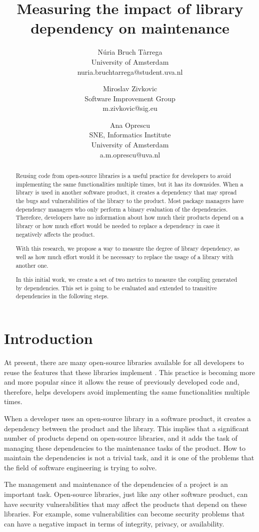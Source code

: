 \documentclass[a4paper]{article}
\title{Measuring the impact of library dependency on maintenance}
\author{
Núria Bruch Tàrrega \\ University of Amsterdam \\ nuria.bruchtarrega@student.uva.nl
\and
Miroslav Zivkovic \\ Software Improvement Group \\ m.zivkovic@sig.eu
\and
Ana Oprescu \\ SNE, Informatics Institute\\
                University of Amsterdam \\ a.m.oprescu@uva.nl
}
\begin{document}
\maketitle

\begin{abstract}
Reusing code from open-source libraries is a useful practice for developers to avoid implementing the same functionalities multiple times, but it has its downsides. When a library is used in another software product, it creates a dependency that may spread the bugs and vulnerabilities of the library to the product. Most package managers have dependency managers who only perform a binary evaluation of the dependencies. Therefore, developers have no information about how much their products depend on a library or how much effort would be needed to replace a dependency in case it negatively affects the product.

With this research, we propose a way to measure the degree of library dependency, as well as how much effort would it be necessary to replace the usage of a library with another one.

In this initial work, we create a set of two metrics to measure the coupling generated by dependencies. This set is going to be evaluated and extended to transitive dependencies in the following steps.
\end{abstract}


\section{Introduction}
At present, there are many open-source libraries available for all developers to reuse the features that these libraries implement \cite{kikas2017structure}. This practice is becoming more and more popular since it allows the reuse of previously developed code and, therefore, helps developers avoid implementing the same functionalities multiple times.

When a developer uses an open-source library in a software product, it creates a dependency between the product and the library. This implies that a significant number of products depend on open-source libraries, and it adds the task of managing these dependencies to the maintenance tasks of the product. How to maintain the dependencies is not a trivial task, and it is one of the problems that the field of software engineering is trying to solve.

The management and maintenance of the dependencies of a project is an important task. Open-source libraries, just like any other software product, can have security vulnerabilities that may affect the products that depend on these libraries. For example, some vulnerabilities can become security problems that can have a negative impact in terms of integrity, privacy, or availability.
\end{document}
